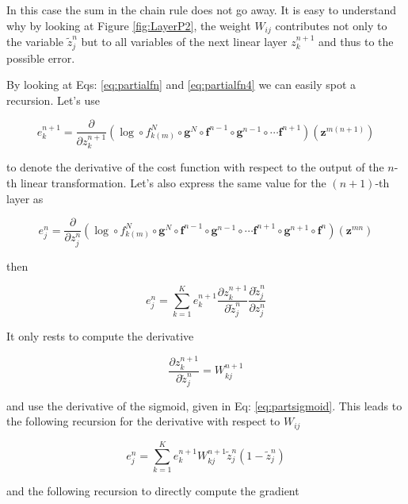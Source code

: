 In this case the sum in the chain rule does not go away. It is easy to
understand why by looking at Figure \ref{fig:LayerP2}, the weight $W_{ij}$
contributes not only to the variable $\tilde{z}^n_j$ but to all variables of the
next linear layer $z^{n+1}_k$ and thus to the possible error. 

By looking at Eqs: \ref{eq:partialfn} and \ref{eq:partialfn4} we can easily
spot a recursion. Let's use

\begin{equation}
e^{n+1}_k = \frac{\partial}{\partial z^{n+1}_{k}} (\log \circ f_{k(m)}^N \circ \mathbf{g}^N \circ \mathbf{f}^{n-1} \circ \mathbf{g}^{n-1} \circ \cdots \mathbf{f}^{n+1})(\mathbf{z}^{m(n+1)})
\end{equation}

\noindent to denote the derivative of the cost function with respect to the
output of the $n$-th linear transformation. Let's also express the same value
for the $(n+1)$-th layer as   

\begin{equation}
e^{n}_j = \frac{\partial}{\partial z^{n}_{j}} (\log \circ f_{k(m)}^N \circ \mathbf{g}^N \circ \mathbf{f}^{n-1} \circ \mathbf{g}^{n-1} \circ \cdots \mathbf{f}^{n+1} \circ \mathbf{g}^{n+1} \circ \mathbf{f}^{n})(\mathbf{z}^{mn}) 
\end{equation}

\noindent then

\begin{equation}
e^{n}_j = \sum_{k=1}^K e^{n+1}_k \frac{\partial z^{n+1}_k}{\partial \tilde{z}_{j}^n}\frac{\partial \tilde{z}^n_{j}}{\partial z_{j}^n} 
\end{equation}

\noindent It only rests to compute the derivative

\begin{equation}
\frac{\partial z^{n+1}_k}{\partial \tilde{z}_{j}^n} = W_{kj}^{n+1} 
\end{equation}

\noindent and use the derivative of the sigmoid, given in Eq:
\ref{eq:partsigmoid}. This leads to the following recursion for the derivative
with respect to $W_{ij}$

\begin{equation}
e^{n}_j = \sum_{k=1}^K e^{n+1}_k W_{kj}^{n+1}\tilde{z}^n_{j}(1-\tilde{z}^n_{j})
\end{equation}

\noindent and the following recursion to directly compute the gradient

